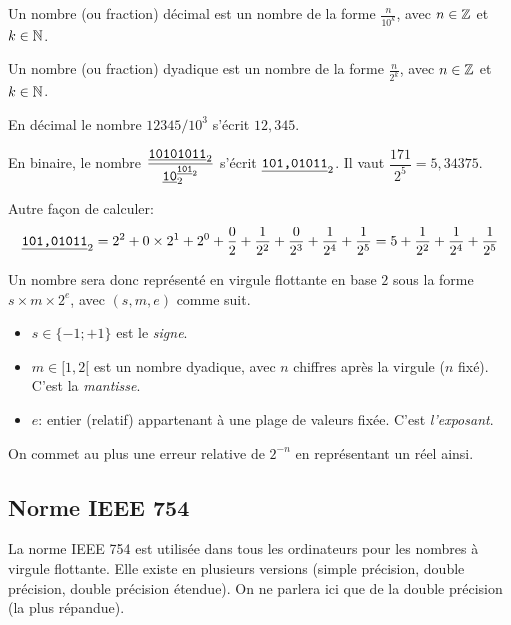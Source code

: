 \begin{defi}
 Un nombre (ou fraction) décimal est un nombre de la forme $\displaystyle\frac{n}{10^k}$, avec $n\in \mathbb{Z}$ et $k\in \mathbb{N}$.
\end{defi}

\begin{defi} 
  Un nombre (ou fraction) dyadique est un nombre de la forme $\displaystyle\frac{n}{2^k}$, avec $n\in
    \mathbb{Z}$ et $k\in \mathbb{N}$.
\end{defi}
\begin{exemple}
En décimal le nombre $12345 / 10^{3}$ s'écrit $12,345$.
\end{exemple}
\begin{exemple}
En binaire, le nombre $\dfrac{\underline{\text{\texttt{10101011}}}_{2}}{\underline{\text{\texttt{10}}}_{2}^{\underline{\text{\texttt{101}}}_{2}}}$ s'écrit
$\underline{\text{\texttt{101,01011}}}_{2}$. Il vaut $\dfrac{171}{2^5}= 5,34375$.

Autre façon de calculer:
\begin{equation*}
  \underline{\text{\texttt{101,01011}}}_{2} =2^2+ 0\times 2^1+2^0 + \dfrac{0}{2} + \dfrac{1}{2^2} + \dfrac{0}{2^3} + \dfrac{1}{2^4} + \dfrac{1}{2^5}= 5 + \frac{1}{2^{2}} + \frac{1}{2^{4}}
  +\frac{1}{2^{5}}
\end{equation*}
\end{exemple}

Un nombre sera donc représenté en virgule flottante en base $2$ sous la forme $s\times m \times 2^{e}$, avec $(s,m,e)$ comme suit.
\begin{itemize}
\item[\textbullet] $s\in\{-1;+1\}$ est le \emph{signe}.
\item[\textbullet] $m\in [1,2[$ est un nombre dyadique, avec $n$ chiffres après la virgule ($n$ fixé). C'est la \emph{mantisse}.
\item[\textbullet] $e$: entier (relatif) appartenant à une plage de valeurs fixée. C'est \emph{l'exposant}.
\end{itemize}

On commet au plus une erreur relative de $2^{-n}$ en représentant un réel ainsi. 


\subsection{Norme IEEE 754}

La norme IEEE 754 est utilisée dans tous les ordinateurs pour les nombres à
  virgule flottante. Elle existe en plusieurs versions (simple précision, double précision, double
  précision étendue). On ne parlera ici que de la double précision (la plus répandue).

